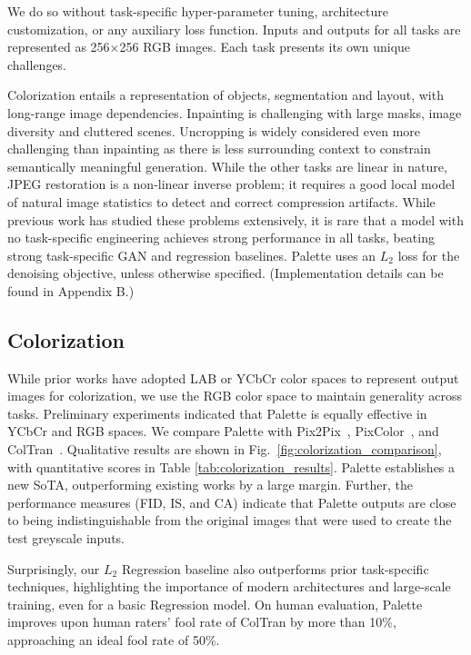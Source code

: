 We do so without task-specific hyper-parameter tuning, architecture customization, or any auxiliary loss function. Inputs and outputs for all tasks are represented as  256$\times$256 RGB images. Each task presents its own unique challenges.

Colorization entails a  representation of objects, segmentation and layout, with long-range image dependencies. Inpainting is  challenging with large masks, image diversity and cluttered scenes. Uncropping is widely considered even more challenging than inpainting as there is less surrounding  context to constrain semantically meaningful generation. While the other tasks are linear in nature, JPEG restoration is a non-linear inverse problem; it requires a good local model of natural image statistics to detect and correct compression artifacts. While previous work has studied these problems extensively, it is rare that a model with no task-specific engineering achieves strong performance in all tasks, beating strong task-specific GAN and regression baselines. Palette uses an $L_2$ loss for the denoising objective, unless otherwise specified. (Implementation details can be found in Appendix B.)

\subsection{Colorization}

While prior works \citep{zhang2016colorful, coltran} have adopted LAB or YCbCr color spaces to represent output images for colorization, we use the RGB color space to maintain generality across tasks. Preliminary experiments indicated that Palette is equally effective in YCbCr and RGB spaces. We compare Palette with  Pix2Pix~\citep{isola2017image}, PixColor~\citep{guadarrama2017pixcolor}, and ColTran~\citep{coltran}. Qualitative results are shown in Fig.\, \ref{fig:colorization_comparison}, with quantitative scores in Table \ref{tab:colorization_results}.
Palette establishes a new SoTA, outperforming existing works by a large margin. Further, the performance measures (FID, IS, and CA) indicate that Palette outputs are close to being indistinguishable from the original images that were used to create the test greyscale inputs.

Surprisingly, our $L_2$ Regression baseline also outperforms prior task-specific techniques, highlighting the importance of modern architectures and large-scale training, even for a basic Regression model. On human evaluation, Palette improves upon human raters' fool rate of ColTran by more than 10\%, approaching an ideal fool rate of 50\%.  

